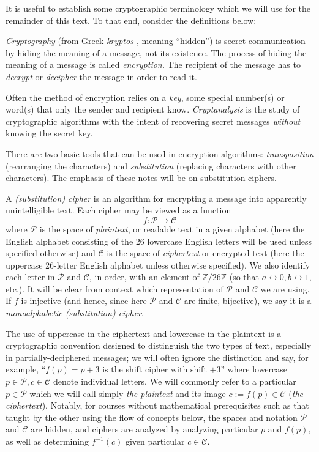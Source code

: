 \documentclass[11pt]{article}
\theoremstyle{plain}
\theoremstyle{remark}
\theoremstyle{definition}
\theoremstyle{definition}
\theoremstyle{definition}
\theoremstyle{plain}
\theoremstyle{plain}
\theoremstyle{plain}
\theoremstyle{definition}
\begin{document}
It is useful to establish some cryptographic terminology which we
will use for the remainder of this text. To that end, consider the
definitions below:

\textit{Cryptography }(from Greek \emph{kryptos-}, meaning ``hidden'')
is secret communication by hiding the meaning of a message, not its
existence. The process of hiding the meaning of a message is called
\textit{encryption.} The recipient of the message has to \textit{decrypt
}or \textit{decipher} the message in order to read it. 

Often the method of encryption relies on a \textit{key}, some special
number(s) or word(s) that only the sender and recipient know.\textit{
Cryptanalysis} is the study of cryptographic algorithms with the intent
of recovering secret messages \emph{without} knowing the secret key. 

There are two basic tools that can be used in encryption algorithms:
\textit{transposition} (rearranging the characters) and \textit{substitution}
(replacing characters with other characters). The emphasis of these
notes will be on substitution ciphers.

A \textit{(substitution)} \textit{cipher} is an algorithm for encrypting
a message into apparently unintelligible\textit{ }text\textit{. }Each
cipher may be viewed as a function 
\[
f:\mathcal{P}\to\mathcal{C}
\]
where $\mathcal{P}$ is the space of \textit{plaintext}, or readable
text in a given alphabet (here the English alphabet consisting of
the $26$ lowercase English letters will be used unless specified
otherwise) and $\mathcal{C}$ is the space of \textit{ciphertext}
or encrypted text (here the uppercase $26$-letter English alphabet
unless otherwise specified). We also identify each letter in $\mathcal{P}$ and $\mathcal{C}$,
in order, with an element of $\mathbb{Z}/26\mathbb{Z}$ (so
that $a\leftrightarrow0,b\leftrightarrow1$, etc.). It will be clear
from context which representation of $\mathcal{P}$ and $\mathcal{C}$
we are using. If $f$ is injective (and hence, since here $\mathcal{P}$
and $\mathcal{C}$ are finite, bijective), we say it is a \textit{monoalphabetic
(substitution) cipher}.

The use of uppercase in the ciphertext and lowercase in the plaintext
is a cryptographic convention designed to distinguish the two types
of text, especially in partially-deciphered messages; we will often
ignore the distinction and say, for example, ``$f(p)=p+3$ is the
shift cipher with shift $+3$'' where lowercase $p\in\mathcal{P},c\in\mathcal{C}$ denote individual letters. We will commonly refer to a particular
$p\in\mathcal{P}$ which we will call simply \textit{the plaintext}
and its image $c:=f(p)\in\mathcal{C}$ (\textit{the ciphertext}). Notably,
for courses without mathematical prerequisites such as that taught
by the other using the flow of concepts below, the spaces and notation
$\mathcal{P}$ and $\mathcal{C}$ are hidden, and ciphers are analyzed
by analyzing particular $p$ and $f(p)$, as well as determining $f^{-1}(c)$
given particular $c\in\mathcal{C}$. 
\end{document}
